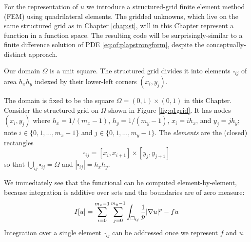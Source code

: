 For the representation of $u$ we introduce a structured-grid finite element method (FEM) using quadrilateral elements.  The gridded unknowns, which live on the same structured grid as in Chapter \ref{chap:st}, will in this Chapter represent a function in a function space.  The resulting code will be surprisingly-similar to a finite difference solution of PDE \eqref{eq:of:plapstrongform}, despite the conceptually-distinct approach.

\begin{marginfigure}
\caption{Our domain $\Omega$ is a unit square.  The structured grid divides it into elements $\square_{ij}$ of area $h_x h_y$ indexed by their lower-left corners $(x_i,y_j)$.}
\label{fig:q1grid}
\end{marginfigure}

The domain is fixed to be the square $\Omega = (0,1)\times (0,1)$ in this Chapter.  Consider the structured grid on $\Omega$ shown in Figure \ref{fig:q1grid}.  It has nodes $(x_i,y_j)$ where $h_x=1/(m_x-1)$, $h_y=1/(m_y-1)$, $x_i = i h_x$, and $y_j = j h_y$; note $i\in \{0,1,\dots,m_x-1\}$ and $j\in\{0,1,\dots,m_y-1\}$.  The \emph{elements} are the (closed) rectangles
   $$\square_{ij} = [x_i,x_{i+1}] \times [y_j,y_{j+1}]$$
so that $\bigcup_{ij} \square_{ij} = \overline{\Omega}$ and $|\square_{ij}| = h_x h_y$.

We immediately see that the functional can be computed element-by-element, because integration is additive over sets and the boundaries are of zero measure:
\begin{equation}
I[u] = \sum_{i=0}^{m_x-1} \sum_{j=0}^{m_y-1} \int_{\square_{ij}} \frac{1}{p} |\nabla u|^p - fu  \label{eq:of:sumoverelements}
\end{equation}
Integration over a single element $\square_{ij}$ can be addressed once we represent $f$ and $u$.

